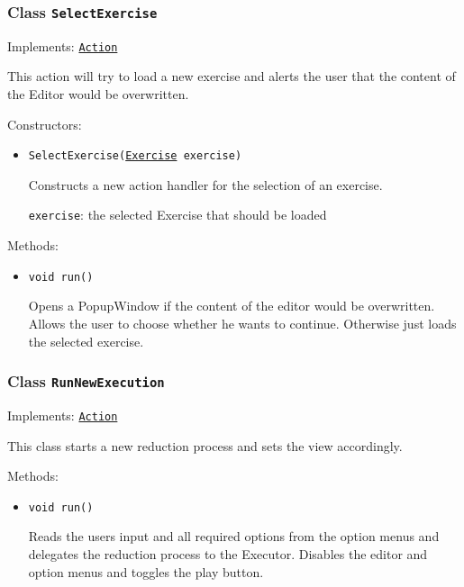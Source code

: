 \subsubsection{Class \texttt{SelectExercise}}
\label{type:edu.kit.wavelength.client.view.action.SelectExercise}
Implements: \texttt{\hyperref[type:edu.kit.wavelength.client.view.action.Action]{Action}}

This action will try to load a new exercise and alerts the user that the
 content of the Editor would be overwritten.

Constructors:
\begin{itemize}
\item \texttt{SelectExercise(\hyperref[type:edu.kit.wavelength.client.view.exercise.Exercise]{Exercise} exercise)}

Constructs a new action handler for the selection of an exercise.

\texttt{exercise}: the selected Exercise that should be loaded

\end{itemize}

Methods:
\begin{itemize}
\item \texttt{void run()}

Opens a PopupWindow if the content of the editor would be overwritten.
 Allows the user to choose whether he wants to continue.
 Otherwise just loads the selected exercise.

\end{itemize}

\subsubsection{Class \texttt{RunNewExecution}}
\label{type:edu.kit.wavelength.client.view.action.RunNewExecution}
Implements: \texttt{\hyperref[type:edu.kit.wavelength.client.view.action.Action]{Action}}

This class starts a new reduction process and sets the view accordingly.

Methods:
\begin{itemize}
\item \texttt{void run()}

Reads the users input and all required options from the option menus and
 delegates the reduction process to the Executor.
 Disables the editor and option menus and toggles the play button.

\end{itemize}

